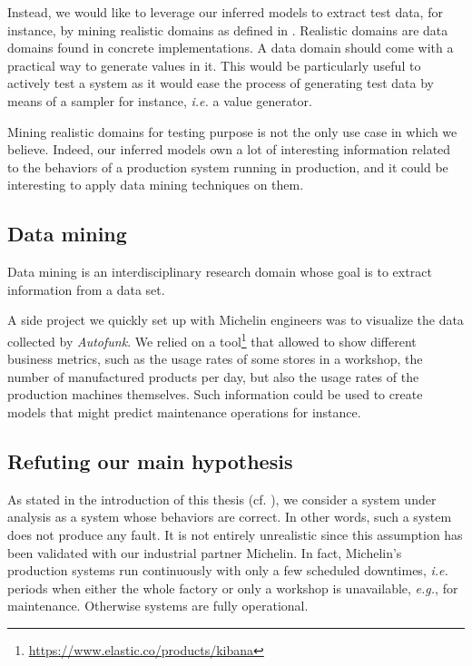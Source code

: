 Instead, we would like to leverage our inferred models to extract
test data, for instance, by mining realistic domains as defined
in \cite{Enderlin:2011:PSL:2075545.2075551}. Realistic domains
are data domains found in concrete implementations. A data domain
should come with a practical way to generate values in it. This
would be particularly useful to actively test a system as it
would ease the process of generating test data by means of a
sampler for instance, \emph{i.e.} a value generator.

Mining realistic domains for testing purpose is not the only use
case in which we believe. Indeed, our inferred models own a lot
of interesting information related to the behaviors of a
production system running in production, and it could be
interesting to apply data mining techniques on them.

\subsection{Data mining}
\label{sec:conclusion:testing:data}

Data mining \cite{chakrabarti2006data} is an interdisciplinary
research domain whose goal is to extract information from a data
set.

A side project we quickly set up with Michelin engineers was to
visualize the data collected by \textit{Autofunk}. We relied on a
tool\footnote{\url{https://www.elastic.co/products/kibana}} that
allowed to show different business metrics, such as the usage
rates of some stores in a workshop, the number of manufactured
products per day, but also the usage rates of the production
machines themselves. Such information could be used to create
models that might predict maintenance operations for instance.



\subsection{Refuting our main hypothesis}
\label{sec:conclusion:testing:valid}

As stated in the introduction of this thesis (cf.
), we consider a system
under analysis as a system whose behaviors are correct. In other
words, such a system does not produce any fault. It is not
entirely unrealistic since this assumption has been validated
with our industrial partner Michelin. In fact, Michelin's
production systems run continuously with only a few scheduled
downtimes, \emph{i.e.} periods when either the whole factory or only a
workshop is unavailable, \emph{e.g.}, for maintenance. Otherwise systems
are fully operational.

